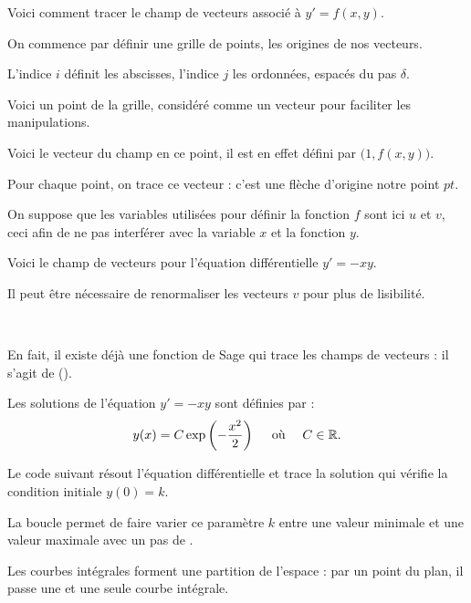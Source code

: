   
\diapo 
Voici comment tracer le champ de vecteurs associé à $y' = f(x,y)$.
  
On commence par définir une grille de points, les origines de nos vecteurs.

L'indice $i$ définit les abscisses, l'indice $j$ les ordonnées, 
espacés du pas $\delta$. 

Voici un point de la grille, considéré comme un vecteur pour faciliter les manipulations.

Voici le vecteur du champ en ce point, il est en effet défini par $\big( 1 , f(x,y) \big)$.

Pour chaque point, on trace ce vecteur : c'est une flèche d'origine notre point $pt$.

\change
On suppose que les variables utilisées pour définir la fonction $f$ sont ici $u$ et $v$, ceci afin de ne pas interférer avec la variable $x$ et la fonction $y$.


\diapo   

Voici le champ de vecteurs pour l'équation différentielle $y' = -xy$.

Il peut être nécessaire de renormaliser les vecteurs $v$ pour plus de lisibilité. %

~

En fait, il existe déjà une fonction de Sage qui trace les champs de vecteurs : il s'agit de ().
  
\diapo   
 
\change
Les solutions de l'équation $y' = -xy$ sont définies par :
    $$y(x) = C \exp\left(-\frac{x^2}{2}\right) \quad \text{ où } \quad C \in \mathbb{R}.$$
    
\change
 Le code suivant résout l'équation différentielle et trace la solution 
    qui vérifie la condition initiale $y(0)=k$.
    
 La boucle permet de faire varier ce paramètre $k$ entre une valeur minimale et une valeur maximale   
    avec un pas de .
 

\diapo    

Les courbes intégrales forment une partition 
de l'espace : par un point du plan, il passe une et une seule courbe intégrale. 


